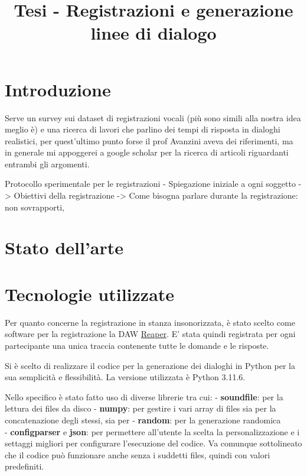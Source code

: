 \documentclass[
]{article}
\title{Tesi - Registrazioni e generazione linee di dialogo}
\author{}
\date{}
\begin{document}
\maketitle

{
\setcounter{tocdepth}{2}
\tableofcontents
}
\section{Introduzione}\label{introduzione}

Serve un survey sui dataset di registrazioni vocali (più sono simili alla nostra idea meglio è) e una ricerca di lavori che parlino dei tempi di risposta in dialoghi realistici, per quest'ultimo punto forse il prof Avanzini aveva dei riferimenti, ma in generale mi appoggerei a google scholar per la ricerca di articoli riguardanti entrambi gli argomenti.

Protocollo sperimentale per le registrazioni - Spiegazione iniziale a ogni soggetto -\textgreater{} Obiettivi della registrazione -\textgreater{} Come bisogna parlare durante la registrazione: non sovrapporti,

\section{Stato dell'arte}\label{stato-dellarte}

\section{Tecnologie utilizzate}\label{tecnologie-utilizzate}

Per quanto concerne la registrazione in stanza insonorizzata, è stato scelto come software per la registrazione la DAW \href{https://www.reaper.fm/}{Reaper}. E' stata quindi registrata per ogni partecipante una unica traccia contenente tutte le domande e le risposte.

Si è scelto di realizzare il codice per la generazione dei dialoghi in Python per la sua semplicità e flessibilità. La versione utilizzata è Python 3.11.6.

Nello specifico è stato fatto uso di diverse librerie tra cui: - \textbf{soundfile}: per la lettura dei files da disco - \textbf{numpy}: per gestire i vari array di files sia per la concatenazione degli stessi, sia per - \textbf{random}: per la generazione randomica\\
- \textbf{configparser} e \textbf{json}: per permettere all'utente la scelta la personalizzazione e i settaggi migliori per configurare l'esecuzione del codice. Va comunque sottolineato che il codice può funzionare anche senza i suddetti files, quindi con valori predefiniti.
\end{document}
